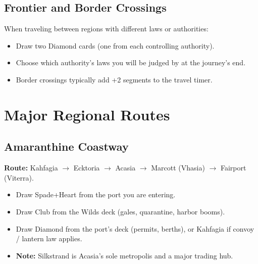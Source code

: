 \subsection{Frontier and Border Crossings}\label{subsec:frontier_travel}

When traveling between regions with different laws or authorities:

\begin{itemize}
    \item Draw two Diamond cards (one from each controlling authority).
    \item Choose which authority's laws you will be judged by at the journey's end.
    \item Border crossings typically add +2 segments to the travel timer.
\end{itemize}

\section{Major Regional Routes}\label{sec:regional_routes}

\subsection{Amaranthine Coastway}\label{subsec:amaranthine_coastway}

\textbf{Route:} Kahfagia $\rightarrow$ Ecktoria $\rightarrow$ Acasia $\rightarrow$ Marcott (Vhasia) $\rightarrow$ Fairport (Viterra).

\begin{itemize}
    \item Draw Spade+Heart from the port you are entering.
    \item Draw Club from the Wilds deck (gales, quarantine, harbor booms).
    \item Draw Diamond from the port's deck (permits, berths), or Kahfagia if convoy / lantern law applies.
    \item \textbf{Note:} Silkstrand is Acasia's sole metropolis and a major trading hub.
\end{itemize}

